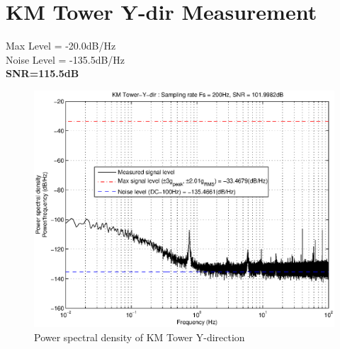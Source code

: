 \documentclass[11pt]{article} %
\begin{document}
\section{KM Tower Y-dir Measurement}
Max Level = -20.0dB/Hz\\
Noise Level = -135.5dB/Hz\\
\textbf{SNR=115.5dB}
\begin{figure}[!hbpt]
\centering
\includegraphics[keepaspectratio=true,width=1\linewidth]{figs/KMTower-Y-dir.eps}
\caption{Power spectral density of KM Tower Y-direction}
\label{fig:psd2}
\end{figure}

\clearpage
\end{document}

